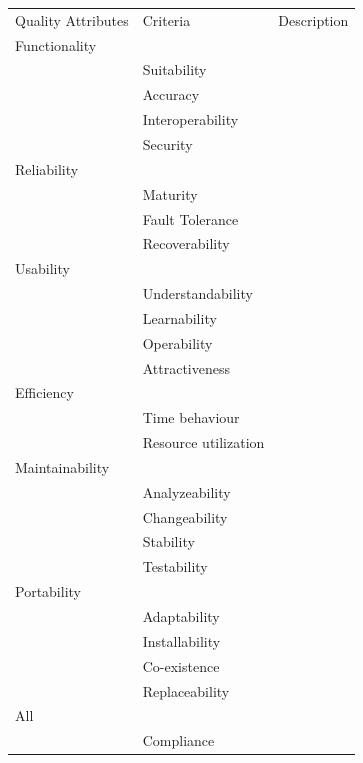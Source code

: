 \begin{table}
    \begin{tabular}{lll}
    Quality Attributes & Criteria             & Description \\
    Functionality      & ~                    & ~           \\
    ~                  & Suitability          & ~           \\
    ~                  & Accuracy             & ~           \\
    ~                  & Interoperability     & ~           \\
    ~                  & Security             & ~           \\
    Reliability        & ~                    & ~           \\
    ~                  & Maturity             & ~           \\
    ~                  & Fault Tolerance      & ~           \\
    ~                  & Recoverability       & ~           \\
    Usability          & ~                    & ~           \\
    ~                  & Understandability    & ~           \\
    ~                  & Learnability         & ~           \\
    ~                  & Operability          & ~           \\
    ~                  & Attractiveness       & ~           \\
    Efficiency         & ~                    & ~           \\
    ~                  & Time behaviour       & ~           \\
    ~                  & Resource utilization & ~           \\
    Maintainability    & ~                    & ~           \\
    ~                  & Analyzeability       & ~           \\
    ~                  & Changeability        & ~           \\
    ~                  & Stability            & ~           \\
    ~                  & Testability          & ~           \\
    Portability        & ~                    & ~           \\
    ~                  & Adaptability         & ~           \\
    ~                  & Installability       & ~           \\
    ~                  & Co-existence         & ~           \\
    ~                  & Replaceability       & ~           \\
    All                & ~                    & ~           \\
    ~                  & Compliance           & ~           \\
    \end{tabular}
\end{table}
